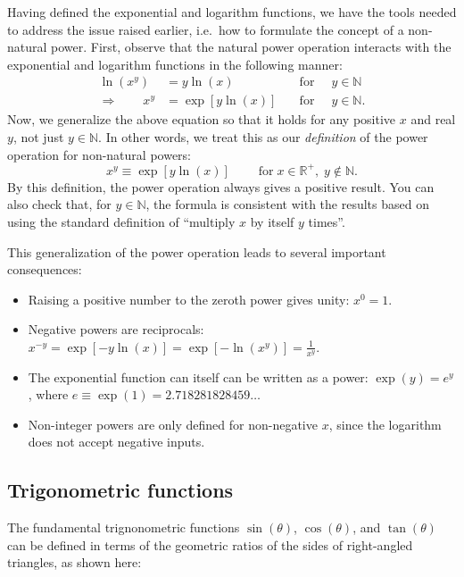 \documentclass[10pt,a4paper]{article}
\begin{document}
Having defined the exponential and logarithm functions, we have the
tools needed to address the issue raised earlier, i.e.~how to formulate
the concept of a non-natural power. First, observe that the natural
power operation interacts with the exponential and logarithm functions
in the following manner:
\begin{align}
  \ln(x^y) &= y \ln(x)\qquad\quad&\mathrm{for}&\;\;y \in \mathbb{N} \\
  \Rightarrow\quad\quad x^y &= \exp[y \ln(x)] \quad &\mathrm{for}&\;\;y \in \mathbb{N}.
\end{align}
Now, we generalize the above equation so that it holds for any positive
$x$ and real $y$, not just $y \in \mathbb{N}$. In other words, we
treat this as our \emph{definition} of the power operation for
non-natural powers:
\begin{equation}
x^y \equiv \exp[y \ln(x)] \qquad\; \mathrm{for}\; x \in \mathbb{R}^+, \;y \notin \mathbb{N}.
\end{equation}
By this definition, the power operation always gives a positive
result.  You can also check that, for $y \in \mathbb{N}$, the formula
is consistent with the results based on using the standard definition
of ``multiply $x$ by itself $y$ times''.

This generalization of the power operation leads to several important
consequences:
\begin{itemize}
\item Raising a positive number to the zeroth power gives
  unity: $\displaystyle x^0 = 1.$

\item
  Negative powers are reciprocals:
$\displaystyle x^{-y} = \exp[-y\ln(x)] = \exp[-\ln(x^y)] = \frac{1}{x^y}.$

\item The exponential function can itself can be written as a power:
$\displaystyle\exp(y) = e^y$, where $e \equiv \exp(1) = 2.718281828459\dots$

\item Non-integer powers are only defined for non-negative $x$, since
  the logarithm does not accept negative inputs.
\end{itemize}

\subsection{Trigonometric functions}
\label{trigonometric-functions}

The fundamental trignonometric functions $\sin(\theta)$,
$\cos(\theta)$, and $\tan(\theta)$ can be defined in terms of the
geometric ratios of the sides of right-angled triangles, as shown here:
\end{document}
